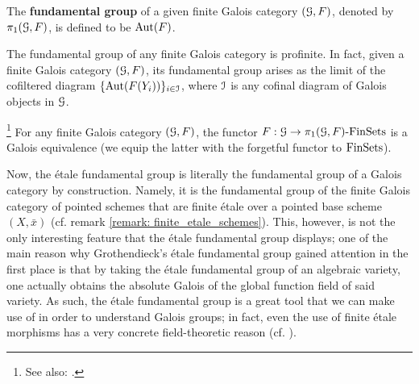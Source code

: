                 \begin{definition} \label{def: fundamental_groups_of_finite_galois_categories}
                    The \textbf{fundamental group} of a given finite Galois category $(\mathcal{G}, F)$, denoted by $\pi_1(\mathcal{G}, F)$, is defined to be $\mathrm{Aut}(F)$.
                \end{definition}
                \begin{proposition} \label{prop: fundamental_groups_of_finite_galois_categories_are_profinite}
                    The fundamental group of any finite Galois category is profinite. In fact, given a finite Galois category $(\mathcal{G}, F)$, its fundamental group arises as the limit of the cofiltered diagram $\{\mathrm{Aut}(F(Y_i))\}_{i \in \mathcal{I}}$, where $\mathcal{I}$ is any cofinal diagram of Galois objects in $\mathcal{G}$.
                \end{proposition}
                \begin{proposition} \label{prop: finite_categorical_galois_correspondence}
                    \footnote{See also: \cite[\href{https://stacks.math.columbia.edu/tag/0BN4}{Tag 0BN4}]{stacks}.}\cite[Theorem 1.1.1]{} For any finite Galois category $(\mathcal{G}, F)$, the functor $F: \mathcal{G} \to \pi_1(\mathcal{G}, F)\text{-}\mathrm{Fin}\mathrm{Sets}$ is a Galois equivalence (we equip the latter with the forgetful functor to $\mathrm{Fin}\mathrm{Sets}$).
                \end{proposition}
                
                Now, the \'etale fundamental group is literally the fundamental group of a Galois category by construction. Namely, it is the fundamental group of the finite Galois category of pointed schemes that are finite \'etale over a pointed base scheme $(X, \bar{x})$ (cf. remark \ref{remark: finite_etale_schemes}). This, however, is not the only interesting feature that the \'etale fundamental group displays; one of the main reason why Grothendieck's \'etale fundamental group gained attention in the first place is that by taking the \'etale fundamental group of an algebraic variety, one actually obtains the absolute Galois of the global function field of said variety. As such, the \'etale fundamental group is a great tool that we can make use of in order to understand Galois groups; in fact, even the use of finite \'etale morphisms has a very concrete field-theoretic reason (cf. \cite[\href{https://stacks.math.columbia.edu/tag/00U3}{Tag 00U3}]{stacks}).
                

